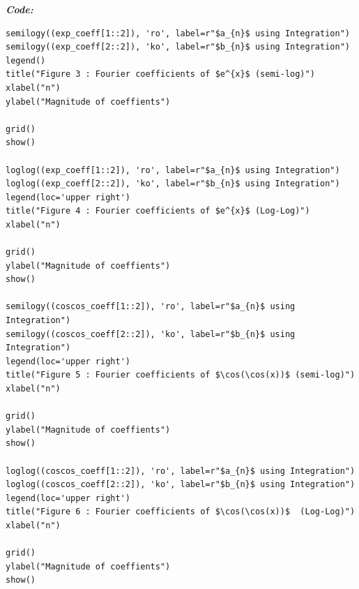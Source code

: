 \documentclass[11pt, a4paper]{article}
\begin{document}
    \textit{\textbf{Code:}}
    \begin{lstlisting}
semilogy((exp_coeff[1::2]), 'ro', label=r"$a_{n}$ using Integration")
semilogy((exp_coeff[2::2]), 'ko', label=r"$b_{n}$ using Integration")
legend()
title("Figure 3 : Fourier coefficients of $e^{x}$ (semi-log)")
xlabel("n")
ylabel("Magnitude of coeffients")

grid()
show()

loglog((exp_coeff[1::2]), 'ro', label=r"$a_{n}$ using Integration")
loglog((exp_coeff[2::2]), 'ko', label=r"$b_{n}$ using Integration")
legend(loc='upper right')
title("Figure 4 : Fourier coefficients of $e^{x}$ (Log-Log)")
xlabel("n")

grid()
ylabel("Magnitude of coeffients")
show()

semilogy((coscos_coeff[1::2]), 'ro', label=r"$a_{n}$ using Integration")
semilogy((coscos_coeff[2::2]), 'ko', label=r"$b_{n}$ using Integration")
legend(loc='upper right')
title("Figure 5 : Fourier coefficients of $\cos(\cos(x))$ (semi-log)")
xlabel("n")

grid()
ylabel("Magnitude of coeffients")
show()

loglog((coscos_coeff[1::2]), 'ro', label=r"$a_{n}$ using Integration")
loglog((coscos_coeff[2::2]), 'ko', label=r"$b_{n}$ using Integration")
legend(loc='upper right')
title("Figure 6 : Fourier coefficients of $\cos(\cos(x))$  (Log-Log)")
xlabel("n")

grid()
ylabel("Magnitude of coeffients")
show()

    \end{lstlisting}
\end{document}
